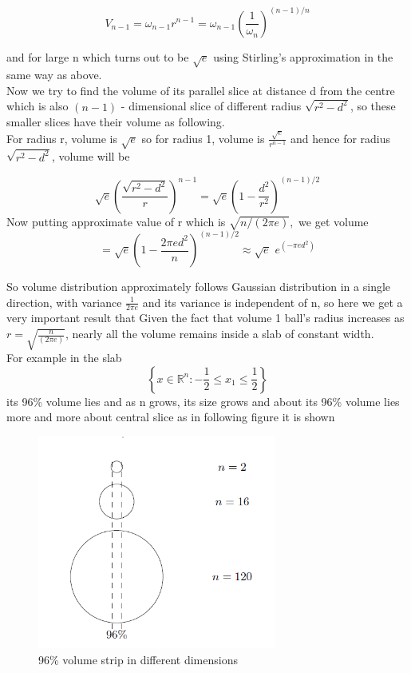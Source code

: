 \documentclass[oneside]{book}
\begin{document}
	$$ V_{n - 1} = \omega_{n-1} r^{n-1}=\omega_{n-1}\left(\frac{1}{\omega_{n}}\right)^{(n-1) / n}$$
	
	and for large n    which turns out to be $\sqrt{e} $ using Stirling's approximation in the same way as above.\\
	Now we try to find the volume of its parallel slice at distance d from the centre which is also $(n - 1)$ -  dimensional slice of different radius $\sqrt{r^2- d^2}$, so these smaller slices have their volume as following. \\
	For radius r, volume is $\sqrt{e}$ so for radius 1, volume is $\frac{\sqrt{e}}{r^{n-1}}$ and hence for radius $\sqrt{r^2- d^2}$, volume will be 
	
	
	\[
	\sqrt{e}\left(\frac{\sqrt{r^{2}-d^{2}}}{r}\right)^{n-1}=\sqrt{e}\left(1-\frac{d^{2}}{r^{2}}\right)^{(n-1) / 2}
	\]
	Now putting approximate value of r which is $\sqrt{n /(2 \pi e)},$ we get volume 
	\[
	= \sqrt{e}\left(1-\frac{2     \pi e d^{2}}{n}\right)^{(n-1) / 2} \approx \sqrt{e} \hspace{4pt} e^{\left(-\pi e d^{2}\right)}
	\]
	
	So volume distribution approximately follows Gaussian distribution  in a single direction, with variance $\frac{1}{2 \pi e}$
	and its variance is independent of n, so here we get a very important result that Given the fact that volume 1 ball's radius increases as $r = \sqrt{\frac{n}{(2 \pi e)}}$, nearly all the volume remains inside a slab of constant width. \\
	For example in the slab $$\left\{x \in \mathbb{R}^{n}:-\frac{1}{2} \leq x_{1} \leq \frac{1}{2}\right\}$$  its 96\%  volume lies and as n grows, its size grows and about its 96\% volume lies more and more about central slice as in following figure it is shown
	\begin{figure}
		\centering
	
		\includegraphics[width = 0.7\textwidth]{B2.png}
		\caption{96\% volume strip in different dimensions }
		\label{f:1}
	\end{figure}
	
\end{document}
